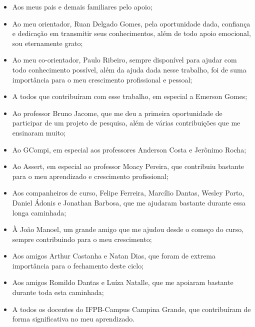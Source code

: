 \begin{agradecimentos}
\begin{itemize}
    \item Aos meus pais e demais familiares pelo apoio;
    \item Ao meu orientador, Ruan Delgado Gomes, pela oportunidade dada, confiança e dedicação em transmitir seus conhecimentos, além de todo apoio emocional, sou eternamente grato;  
    \item Ao meu co-orientador, Paulo Ribeiro, sempre disponível para ajudar com todo conhecimento possível, além da ajuda dada nesse trabalho, foi de suma importância para o meu crescimento profissional e pessoal;  
    \item A todos que contribuíram com esse trabalho, em especial a Emerson Gomes; 
    \item Ao professor Bruno Jacome, que me deu a primeira oportunidade de participar de um projeto de pesquisa, além de várias contribuições que me ensinaram muito;
    \item Ao GCompi, em especial aos professores Anderson Costa e Jerônimo Rocha;
    \item Ao Assert, em especial ao professor Moacy Pereira, que contribuiu bastante para o meu aprendizado e crescimento profissional;
    \item Aos companheiros de curso, Felipe Ferreira, Marcílio Dantas, Wesley Porto, Daniel Ádonis e Jonathan Barbosa, que me ajudaram bastante durante essa longa caminhada;
    \item À João Manoel, um grande amigo que me ajudou desde o começo do curso, sempre contribuindo para o meu crescimento; 
    \item Aos amigos Arthur Castanha e Natan Dias, que foram de extrema importância para o fechamento deste ciclo;
    \item Aos amigos Romildo Dantas e Luíza Natalle, que me apoiaram bastante durante toda esta caminhada;
    \item A todos os docentes do IFPB-Campus Campina Grande, que contribuíram de forma significativa no meu aprendizado.
     
    
\end{itemize}

\end{agradecimentos}
